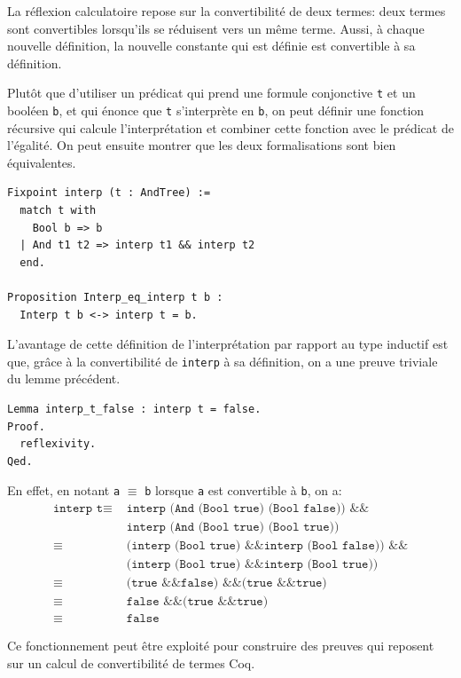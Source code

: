 \documentclass[11pt]{article}
\begin{document}
La réflexion calculatoire repose sur la convertibilité de deux termes: deux termes sont convertibles lorsqu'ils se réduisent vers un même terme. Aussi, à chaque nouvelle définition, la nouvelle constante qui est définie est convertible à sa définition. \medbreak

Plutôt que d'utiliser un prédicat qui prend une formule conjonctive \texttt{t} et un booléen \texttt{b}, et qui énonce que \texttt{t} s'interprète en \texttt{b}, on peut définir une fonction récursive qui calcule l'interprétation et combiner cette fonction avec le prédicat de l'égalité. On peut ensuite montrer que les deux formalisations sont bien équivalentes.  

\begin{lstlisting}[frame=single]
Fixpoint interp (t : AndTree) :=
  match t with
    Bool b => b
  | And t1 t2 => interp t1 && interp t2
  end.
  
Proposition Interp_eq_interp t b :
  Interp t b <-> interp t = b.
\end{lstlisting}


L'avantage de cette définition de l'interprétation par rapport au type inductif est que, grâce à la convertibilité de \texttt{interp} à sa définition, on a une preuve triviale du lemme précédent.

\begin{lstlisting}[frame=single]
Lemma interp_t_false : interp t = false.
Proof.
  reflexivity.
Qed.
\end{lstlisting}

En effet, en notant \texttt{a} $\equiv$ \texttt{b} lorsque \texttt{a} est convertible à \texttt{b}, on a:
\begin{align*}
  \texttt{interp t} \equiv \,\, &\texttt{interp (And (Bool true) (Bool false)) \&\&}  \\
  \,\, &\texttt{interp (And (Bool true) (Bool true))} \\
  \equiv \,\, &\texttt{(interp (Bool true) \&\& interp (Bool false)) \&\&} \\
  \,\,&\texttt{(interp (Bool true) \&\& interp (Bool true))} \\
  \equiv \,\, &\texttt{(true \&\& false) \&\& (true \&\& true)} \\
  \equiv\,\, &\texttt{false \&\& (true \&\& true)} \\
  \equiv\,\, &\texttt{false}
\end{align*}  

Ce fonctionnement peut être exploité pour construire des preuves qui reposent sur un calcul de convertibilité de termes Coq.
\end{document}
